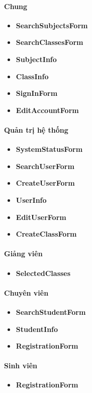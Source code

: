 \documentclass[12pt]{book}
\begin{document}
    \paragraph{Chung}
    \begin{itemize}
      \item \textbf{SearchSubjectsForm}
      \item \textbf{SearchClassesForm}
      \item \textbf{SubjectInfo}
      \item \textbf{ClassInfo}
      \item \textbf{SignInForm}
      \item \textbf{EditAccountForm}
    \end{itemize}

    \paragraph{Quản trị hệ thống}
    \begin{itemize}
      \item \textbf{SystemStatusForm}
      \item \textbf{SearchUserForm}
      \item \textbf{CreateUserForm}
      \item \textbf{UserInfo}
      \item \textbf{EditUserForm}
      \item \textbf{CreateClassForm}
    \end{itemize}

    \paragraph{Giảng viên}
    \begin{itemize}
      \item \textbf{SelectedClasses}
    \end{itemize}

    \paragraph{Chuyên viên}
    \begin{itemize}
      \item \textbf{SearchStudentForm}
      \item \textbf{StudentInfo}
      \item \textbf{RegistrationForm}
    \end{itemize}

    \paragraph{Sinh viên}
    \begin{itemize}
      \item \textbf{RegistrationForm}
    \end{itemize}
\end{document}
